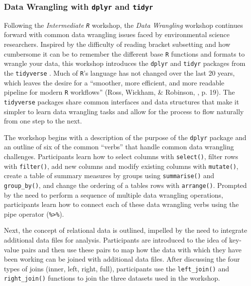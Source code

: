 \documentclass[12pt]{article}
\begin{document}
\subsubsection{Data Wrangling with \texttt{dplyr} and \texttt{tidyr}}
\label{sec:wrangle}

\quad Following the \emph{Intermediate \texttt{R}} workshop, the \emph{Data Wrangling} workshop continues forward with common data wrangling issues faced by environmental science researchers. Inspired by the difficulty of reading bracket subsetting and how cumbersome it can be to remember the different base \texttt{R} functions and formats to wrangle your data, this workshop introduces the \texttt{dplyr} \citep{dpylr} and \texttt{tidyr} \citep{tidyr} packages from the \texttt{tidyverse} \citep{tidyverse}. Much of \texttt{R}'s language has not changed over the last 20 years, which leaves the desire for a ``smoother, more efficient, and more readable pipeline for modern \texttt{R} workflows'' (Ross, Wickham, \& Robinson, \citeyear{tidytools}, p. 19). The \texttt{tidyverse} packages share common interfaces and data structures that make it simpler to learn data wrangling tasks and allow for the process to flow naturally from one step to the next. 

\quad The workshop begins with a description of the purpose of the \texttt{dplyr} package and an outline of six of the common ``verbs'' that handle common data wrangling challenges. Participants learn how to select columns with \texttt{select()}, filter rows with \texttt{filter()}, add new columns and modify existing columns with \texttt{mutate()}, create a table of summary measures by groups using \texttt{summarise()} and \texttt{group\_by()}, and change the ordering of a tables rows with \texttt{arrange()}. Prompted by the need to perform a sequence of multiple data wrangling operations, participants learn how to connect each of these data wrangling verbs using the pipe operator (\texttt{\%>\%}). 

\quad Next, the concept of relational data is outlined, impelled by the need to integrate additional data files for analysis. Participants are introduced to the idea of key-value pairs and then use these pairs to map how the data with which they have been working can be joined with additional data files. After discussing the four types of joins (inner, left, right, full), participants use the \texttt{left\_join()} and  \texttt{right\_join()} functions to join the three datasets used in the workshop. 
\end{document}
